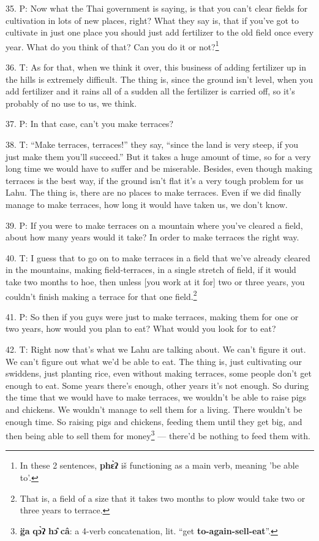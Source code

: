 35. P: Now what the Thai government is saying, is that you can't clear fields for
cultivation in lots of new places, right? What they say is, that if you've got
to cultivate in just one place you should just add fertilizer to the old field
once every year. What do you think of that? Can you do it or not?\footnote{In these 2 sentences, \textbf{phɛ̀ʔ} iš functioning as a main verb, meaning 'be able to'.}

36. T: As for that, when we think it over, this business of adding fertilizer up
in the hills is extremely difficult. The thing is, since the ground isn't level,
when you add fertilizer and it rains all of a sudden all the fertilizer is carried
off, so it's probably of no use to us, we think.

37. P: In that case, can't you make terraces?

38. T: ``Make terraces, terraces!'' they say, ``since the land is very steep, if
you just make them you'll succeed.'' But it takes a huge amount of time, so for
a very long time we would have to suffer and be miserable. Besides, even though
making terraces is the best way, if the ground isn't flat it's a very tough problem
for us Lahu. The thing is, there are no places to make terraces. Even if we did
finally manage to make terraces, how long it would have taken us, we don't know.

39. P: If you were to make terraces on a mountain where you've cleared a field,
about how many years would it take? In order to make terraces the right way.

40. T: I guess that to go on to make terraces in a field that we've already cleared
in the mountains, making field-terraces, in a single stretch of field, if it would
take two months to hoe, then unless [you work at it for] two or three years, you
couldn't finish making a terrace for that one field.\footnote{That is, a field of a size that it takes two months to plow would take two or three years to terrace.}

41. P: So then if you guys were just to make terraces, making them for one or two
years, how would you plan to eat? What would you look for to eat?

42. T: Right now that's what we Lahu are talking about. We can't figure it out.
We can't figure out what we'd be able to eat. The thing is, just cultivating our
swiddens, just planting rice, even without making terraces, some people don't get
enough to eat. Some years there's enough, other years it's not enough. So during
the time that we would have to make terraces, we wouldn't be able to raise pigs
and chickens. We wouldn't manage to sell them for a living. There wouldn't be enough
time. So raising pigs and chickens, feeding them until they get big, and then being
able to sell them for money\footnote{\textbf{g̈a} \textbf{qɔ̀ʔ} \textbf{hɔ̂} \textbf{câ}: a 4-verb concatenation, lit. ``get \textbf{to-again-sell-eat}''.} --- there'd be nothing to feed them with.

